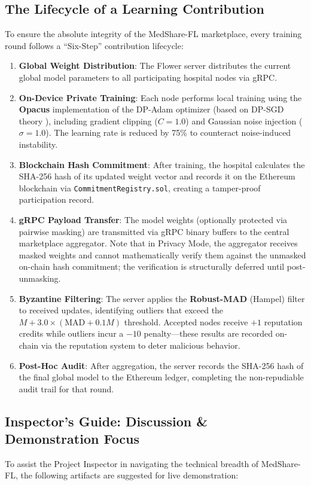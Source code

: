 \documentclass[10pt, a4paper, twocolumn]{article}
\begin{document}
\subsection{The Lifecycle of a Learning Contribution}
To ensure the absolute integrity of the MedShare-FL marketplace, every training round follows a ``Six-Step'' contribution lifecycle:
\begin{enumerate}
    \item \textbf{Global Weight Distribution}: The Flower server distributes the current global model parameters to all participating hospital nodes via gRPC.
    \item \textbf{On-Device Private Training}: Each node performs local training using the \textbf{Opacus} implementation \cite{yousefpour2021} of the DP-Adam optimizer (based on DP-SGD theory \cite{abadi2016}), including gradient clipping ($C=1.0$) and Gaussian noise injection ($\sigma=1.0$). The learning rate is reduced by 75\% to counteract noise-induced instability.
    \item \textbf{Blockchain Hash Commitment}: After training, the hospital calculates the SHA-256 hash of its updated weight vector and records it on the Ethereum blockchain via \texttt{CommitmentRegistry.sol}, creating a tamper-proof participation record.
    \item \textbf{gRPC Payload Transfer}: The model weights (optionally protected via pairwise masking) are transmitted via gRPC binary buffers to the central marketplace aggregator. Note that in Privacy Mode, the aggregator receives masked weights and cannot mathematically verify them against the unmasked on-chain hash commitment; the verification is structurally deferred until post-unmasking.
    \item \textbf{Byzantine Filtering}: The server applies the \textbf{Robust-MAD} (Hampel) filter to received updates, identifying outliers that exceed the $M + 3.0 \times (\text{MAD} + 0.1M)$ threshold. Accepted nodes receive $+1$ reputation credits while outliers incur a $-10$ penalty---these results are recorded on-chain via the reputation system to deter malicious behavior.
    \item \textbf{Post-Hoc Audit}: After aggregation, the server records the SHA-256 hash of the final global model to the Ethereum ledger, completing the non-repudiable audit trail for that round.
\end{enumerate}

\subsection{Inspector's Guide: Discussion \& Demonstration Focus}
To assist the Project Inspector in navigating the technical breadth of MedShare-FL, the following artifacts are suggested for live demonstration:
\end{document}
